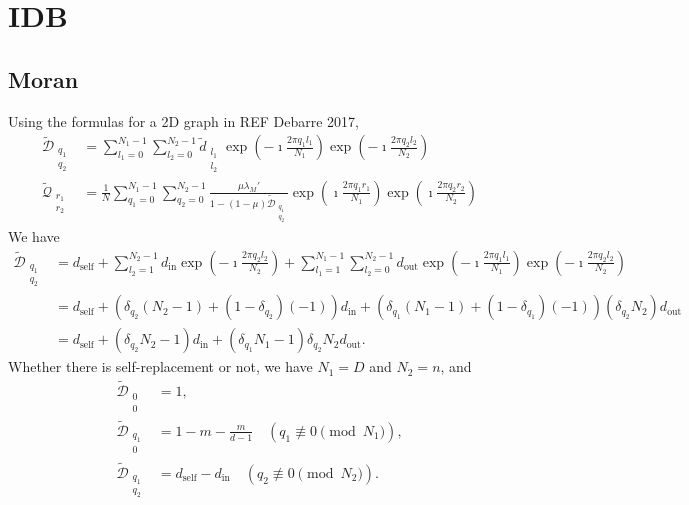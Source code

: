 \documentclass[11pt, letterpaper]{article}
\newcommand{\din}{d_{\textrm{in}}}
\newcommand{\dself}{d_{\textrm{self}}}
\newcommand{\dout}{d_{\textrm{out}}}
\begin{document}
\section{IDB}
\subsection{Moran}
Using the formulas for a 2D graph in REF Debarre 2017,
%
\begin{subequations}
\begin{align}
\tilde{\mathcal{D}}_{\substack{q_1 \\ q_2}} & = \sum_{l_1=0}^{N_1 -1} \sum_{l_2=0}^{N_2 -1} \tilde{d}_{\substack{l_1\\l_2}} \exp\left(-\imath \frac{2\pi q_1 l_1}{N_1}\right)\exp\left(-\imath \frac{2\pi q_2 l_2}{N_2}\right)
\\
\tilde{\mathcal{Q}}_{\substack{r_1\\r_2}}&= \frac{1}{N}  \sum_{q_1=0}^{N_1 -1} \sum_{q_2=0}^{N_2 -1} \frac{\mu \lambda_M'}{1 - (1-\mu) \tilde{\mathcal{D}}_{\substack{q_1\\ q_2}}} \exp\left(\imath \frac{2\pi q_1 r_1}{N_1}\right)\exp\left(\imath \frac{2\pi q_2 r_2}{N_2}\right)
\end{align}
\end{subequations}
%
We have
%
\begin{subequations}
\begin{align}
\tilde{\mathcal{D}}_{\substack{q_1 \\ q_2}} & = \dself + \sum_{l_2=1}^{N_2 -1} \din \exp\left(-\imath \frac{2\pi q_2 l_2}{N_2}\right) 
+ \sum_{l_1=1}^{N_1 -1} \sum_{l_2=0}^{N_2 -1} \dout \exp\left(-\imath \frac{2\pi q_1 l_1}{N_1}\right)\exp\left(-\imath \frac{2\pi q_2 l_2}{N_2}\right) \nonumber \\
%
&= \dself + \left(\delta_{q_2} (N_2-1) + (1-\delta_{q_2}) (-1) \right) \din + \left( \delta_{q_1} (N_1 - 1) + (1-\delta_{q_1}) (-1) \right) \left( \delta_{q_2} N_2 \right) \dout \nonumber \\
%
&= \dself + \left( \delta_{q_2} N_2 - 1 \right) \din + \left( \delta_{q_1} N_1 - 1 \right) \delta_{q_2} N_2 \dout.
\end{align}
\end{subequations}
%
Whether there is self-replacement or not, we have $N_1 = D$ and $N_2 = n$, and
%
\begin{subequations}
\begin{align}
\tilde{\mathcal{D}}_{\substack{0\\0}} & = 1,\\
%
\tilde{\mathcal{D}}_{\substack{q_1\\0}} & = 1-m -  \frac{m}{d-1} \quad (q_1 \not \equiv 0 \pmod{N_1}),\\
%
\tilde{\mathcal{D}}_{\substack{q_1\\q_2}} & = \dself - \din \quad (q_2 \not \equiv 0 \pmod{N_2}).
\end{align}
\end{subequations}
\end{document}
